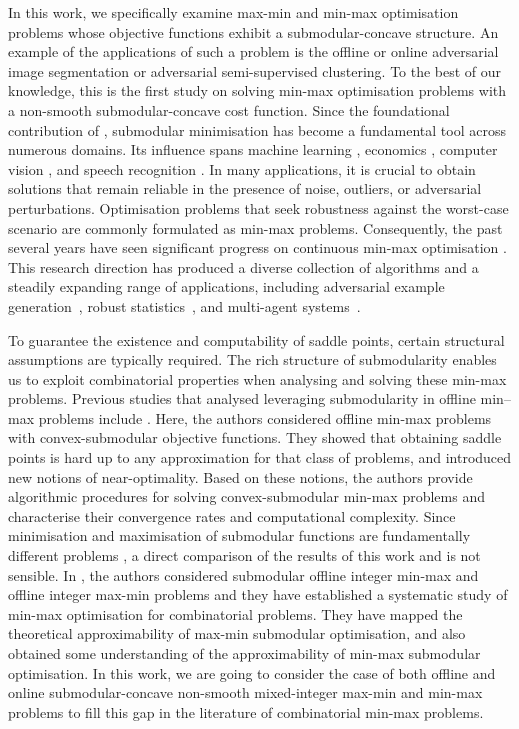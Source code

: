 \documentclass{article}
\theoremstyle{plain}
\theoremstyle{definition}
\theoremstyle{remark}
\begin{document}
     In this work, we specifically examine max-min and min-max optimisation problems whose objective functions exhibit a submodular-concave structure. An example of the applications of such a problem is the offline or online adversarial image segmentation or adversarial semi-supervised clustering. To the best of our knowledge, this is the first study on solving min-max optimisation problems with a non-smooth submodular-concave cost function.
Since the foundational contribution of \cite{edmonds1970submodular}, submodular minimisation has become a fundamental tool across numerous domains. 
Its influence spans machine learning \cite{krause2010submodular}, economics \cite{topkis1998supermodularity}, computer vision \cite{jegelka2013reflection}, and speech recognition \cite{lin2011optimal}. 
In many applications, it is crucial to obtain solutions that remain reliable in the presence of noise, outliers, or adversarial perturbations. 
Optimisation problems that seek robustness against the worst-case scenario are commonly formulated as min-max problems. 
Consequently, the past several years have seen significant progress on continuous min-max optimisation %
\cite{daskalakis2017training,farzin2025minmax,mokhtari2020convergence,farzin2025properties}. 
This research direction has produced a diverse collection of algorithms and a steadily expanding range of applications, including adversarial example generation~\cite{wang2021adversarial}, robust statistics~\cite{agarwal2022minimax}, and multi-agent systems~\cite{li2019robust}. 


To guarantee the existence and computability of saddle points, certain structural assumptions are typically required. The rich structure of submodularity enables us to exploit combinatorial properties when analysing and solving these min-max problems. %
Previous studies that analysed leveraging submodularity in offline min--max problems include %
\cite{adibi2022minimax}. %
Here, the authors considered offline min-max problems with convex-submodular objective functions. They showed that obtaining saddle points is hard up to
any approximation for that class of problems, and introduced new notions of near-optimality. Based on these notions, the authors %
provide algorithmic procedures for solving convex-submodular min-max problems and characterise their convergence
rates and computational complexity. Since minimisation and maximisation of submodular functions are fundamentally different problems \cite{bach2013learning}, a direct comparison of the results of this work and \citep{adibi2022minimax} is not sensible. In \cite{mualem2024submodular}, the authors considered %
submodular offline integer min-max and offline integer max-min %
problems and they %
have established a %
systematic study
of min-max optimisation for combinatorial problems. %
They have mapped the theoretical approximability of max-min submodular optimisation, and also obtained some understanding of the approximability of min-max submodular optimisation. 
In this work, we are going to consider the case of both offline and online submodular-concave non-smooth mixed-integer max-min and min-max problems to fill this gap in the literature of combinatorial min-max problems.
\end{document}
